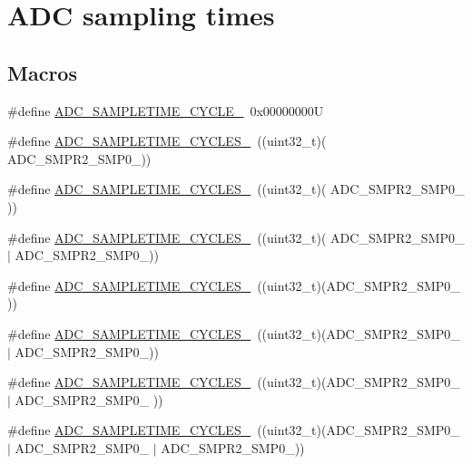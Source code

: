 \hypertarget{group___a_d_c__sampling__times}{}\section{A\+DC sampling times}
\label{group___a_d_c__sampling__times}
\subsection*{Macros}
\begin{DoxyCompactItemize}
\item 
\#define \hyperlink{group___a_d_c__sampling__times_ga01ae8ddd4c3f0a7cace13273c1e67fdd}{A\+D\+C\+\_\+\+S\+A\+M\+P\+L\+E\+T\+I\+M\+E\+\_\+C\+Y\+C\+L\+E\+\_}~0x00000000U
\item 
\#define \hyperlink{group___a_d_c__sampling__times_gac0aff040aa3a0e63147fcdd8ab805af1}{A\+D\+C\+\_\+\+S\+A\+M\+P\+L\+E\+T\+I\+M\+E\+\_\+C\+Y\+C\+L\+E\+S\+\_}~((uint32\+\_\+t)(                                      A\+D\+C\+\_\+\+S\+M\+P\+R2\+\_\+\+S\+M\+P0\+\_))
\item 
\#define \hyperlink{group___a_d_c__sampling__times_ga96ddc2c8f5aec56ef5b6dc7cf908842a}{A\+D\+C\+\_\+\+S\+A\+M\+P\+L\+E\+T\+I\+M\+E\+\_\+C\+Y\+C\+L\+E\+S\+\_}~((uint32\+\_\+t)(                   A\+D\+C\+\_\+\+S\+M\+P\+R2\+\_\+\+S\+M\+P0\+\_                   ))
\item 
\#define \hyperlink{group___a_d_c__sampling__times_ga2fb67421195d0c9f1edb705dcfcd754f}{A\+D\+C\+\_\+\+S\+A\+M\+P\+L\+E\+T\+I\+M\+E\+\_\+C\+Y\+C\+L\+E\+S\+\_}~((uint32\+\_\+t)(                   A\+D\+C\+\_\+\+S\+M\+P\+R2\+\_\+\+S\+M\+P0\+\_ $\vert$ A\+D\+C\+\_\+\+S\+M\+P\+R2\+\_\+\+S\+M\+P0\+\_))
\item 
\#define \hyperlink{group___a_d_c__sampling__times_ga190357836133681e150ddc7242151661}{A\+D\+C\+\_\+\+S\+A\+M\+P\+L\+E\+T\+I\+M\+E\+\_\+C\+Y\+C\+L\+E\+S\+\_}~((uint32\+\_\+t)(A\+D\+C\+\_\+\+S\+M\+P\+R2\+\_\+\+S\+M\+P0\+\_                                      ))
\item 
\#define \hyperlink{group___a_d_c__sampling__times_ga4ea55e3a10a04630820387755f4f448a}{A\+D\+C\+\_\+\+S\+A\+M\+P\+L\+E\+T\+I\+M\+E\+\_\+C\+Y\+C\+L\+E\+S\+\_}~((uint32\+\_\+t)(A\+D\+C\+\_\+\+S\+M\+P\+R2\+\_\+\+S\+M\+P0\+\_                    $\vert$ A\+D\+C\+\_\+\+S\+M\+P\+R2\+\_\+\+S\+M\+P0\+\_))
\item 
\#define \hyperlink{group___a_d_c__sampling__times_ga15c48307b1f2aed2a1c3c6338c13b070}{A\+D\+C\+\_\+\+S\+A\+M\+P\+L\+E\+T\+I\+M\+E\+\_\+C\+Y\+C\+L\+E\+S\+\_}~((uint32\+\_\+t)(A\+D\+C\+\_\+\+S\+M\+P\+R2\+\_\+\+S\+M\+P0\+\_ $\vert$ A\+D\+C\+\_\+\+S\+M\+P\+R2\+\_\+\+S\+M\+P0\+\_                   ))
\item 
\#define \hyperlink{group___a_d_c__sampling__times_ga7172f3d957445df5b98648b25ccc64d4}{A\+D\+C\+\_\+\+S\+A\+M\+P\+L\+E\+T\+I\+M\+E\+\_\+C\+Y\+C\+L\+E\+S\+\_}~((uint32\+\_\+t)(A\+D\+C\+\_\+\+S\+M\+P\+R2\+\_\+\+S\+M\+P0\+\_ $\vert$ A\+D\+C\+\_\+\+S\+M\+P\+R2\+\_\+\+S\+M\+P0\+\_ $\vert$ A\+D\+C\+\_\+\+S\+M\+P\+R2\+\_\+\+S\+M\+P0\+\_))
\end{DoxyCompactItemize}


